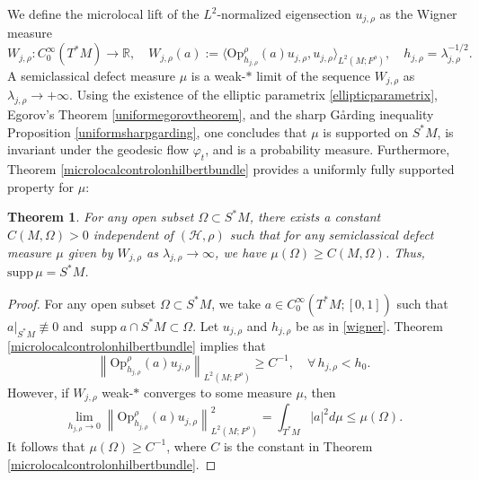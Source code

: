 \documentclass[11pt,oneside,reqno]{amsart}
\newtheorem{theorem}{Theorem}[section]
\theoremstyle{definition}
\numberwithin{equation}{section}
\theoremstyle{plain}
\begin{document}
We define the microlocal lift of the $L^2$-normalized eigensection $u_{j,\rho}$ as the Wigner measure
\begin{equation}\label{wigner}
W_{j,\rho}: C_0^{\infty}(T^*M) \to \mathbb{R}, \quad 
W_{j,\rho}(a) := \langle \mathrm{Op}^{\rho}_{h_{j,\rho}}(a)u_{j,\rho}, u_{j,\rho} \rangle_{L^2(M;F^{\rho})}, \quad h_{j,\rho} = \lambda_{j,\rho}^{-1/2}.
\end{equation}
A semiclassical defect measure $\mu$ is a weak-$*$ limit of the sequence $W_{j,\rho}$ as $\lambda_{j,\rho} \to +\infty$. Using the existence of the elliptic parametrix \eqref{ellipticparametrix}, Egorov’s Theorem \ref{uniformegorovtheorem}, and the sharp Gårding inequality Proposition \ref{uniformsharpgarding}, one concludes that $\mu$ is supported on $S^*M$, is invariant under the geodesic flow $\varphi_t$, and is a probability measure. Furthermore, Theorem \ref{microlocalcontrolonhilbertbundle} provides a uniformly fully supported property for $\mu$:


\begin{theorem}\label{semiclassicaldefectmeasure}
For any open subset $\Omega\subset S^*M$, there exists a constant $C(M,\Omega)>0$ independent of $(\mathcal{H},\rho)$ such that for any semiclassical defect measure $\mu$ given by $W_{j,\rho}$ as $\lambda_{j,\rho}\to \infty$, we have $\mu(\Omega)\ge C(M,\Omega)$. Thus, $\mathrm{supp}\,\mu=S^*M$.
\end{theorem}
\begin{proof}
For any open subset $\Omega \subset S^*M$, we take $a \in C_0^{\infty}(T^* M;[0,1])$ such that $a|_{S^* M} \not \equiv 0$ and $\operatorname{supp} a \cap S^* M \subset \Omega$. Let $u_{j,\rho}$ and $h_{j,\rho}$ be as in \eqref{wigner}. Theorem \ref{microlocalcontrolonhilbertbundle} implies that 
\begin{equation*}
    \left\|\mathrm{Op}_{h_{j,\rho}}^{\rho}(a) u_{j,\rho}\right\|_{L^2(M;F^{\rho})} \geq C^{-1}, \quad \forall\, h_{j,\rho}<h_0.
\end{equation*}
However, if $W_{j,\rho}$ weak-$*$ converges to some measure $\mu$, then
\begin{equation*}
    \lim_{h_{j,\rho}\to 0}\left\|\mathrm{Op}_{h_{j,\rho}}^{\rho}(a) u_{j,\rho}\right\|_{L^2(M;F^{\rho})}^2 =\int_{T^* M}|a|^2 d \mu \leq \mu(\Omega).
\end{equation*}
It follows that $\mu(\Omega)\geq C^{-1}$, where $C$ is the constant in Theorem \ref{microlocalcontrolonhilbertbundle}.
\end{proof}
\end{document}
